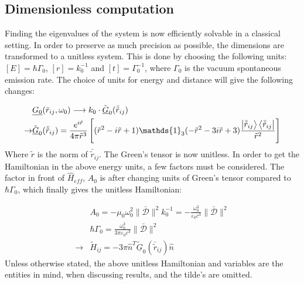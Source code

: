 \documentclass{article}
\begin{document}
\subsection{Dimensionless computation}\label{sec:dimless}

Finding the eigenvalues of the system is now efficiently solvable in a classical setting. In order to preserve as much precision as possible, the dimensions are transformed to a unitless system. This is done by choosing the following units: $[E]=\hbar \Gamma_0$, $[r] = k_0^{-1}$ and $[t] = \Gamma_0^{-1}$, where $\Gamma_0$ is the vacuum spontaneous emission rate. The choice of units for energy and distance will give the following changes: 

\begin{equation}\label{eq:Green_unitless}
    \begin{split}
        &\underline{G_0}(\bar{r}_{ij}, \omega_0) \longrightarrow k_0 \cdot \tilde{\underline{G}}_0(\bar{\tilde{r}}_{ij}) \\
        \rightarrow &\tilde{\underline{G}}_0(\bar{\tilde{r}}_{ij}) = \frac{e^{i\tilde{r}}}{4\pi \tilde{r}^3} \left[ (\tilde{r}^2 - i\tilde{r} + 1) \mathds{1}_3 (-\tilde{r}^2 - 3i\tilde{r} + 3) \frac{\ket{\bar{\tilde{r}}_{ij}}\bra{\bar{\tilde{r}}_{ij}}}{\tilde{r}^2} \right]
    \end{split}
\end{equation}
Where $\tilde{r}$ is the norm of $\bar{\tilde{r}}_{ij}$. The Green's tensor is now unitless. In order to get the Hamiltonian in the above energy units, a few factors must be considered. The factor in front of $\hat{H}_{eff}$, $A_0$ is after changing units of Green's tensor compared to $\hbar \Gamma_0$, which finally gives the unitless Hamiltonian:

\begin{equation}\label{eq:Hamiltonian_unitless}
    \begin{split}
        &A_0 = -\mu_0 \omega_0^2 \| \bar{\mathscr{D}} \|^2 k_0^{-1} = - \frac{\omega_0^3}{\varepsilon_0 c^3} \| \bar{\mathscr{D}} \|^2 \\
        &\hbar \Gamma_0 = \frac{\omega_0^3}{3\pi \varepsilon_0 c^3} \| \bar{\mathscr{D}} \|^2 \\
        \longrightarrow & \tilde{H}_{ij} = -3 \pi \hat{n}^T \underline{\tilde{G}}_0 (\bar{\tilde{r}}_{ij}) \hat{n}
    \end{split}
\end{equation}
Unless otherwise stated, the above unitless Hamiltonian and variables are the entities in mind, when discussing results, and the tilde's are omitted. 
\end{document}
